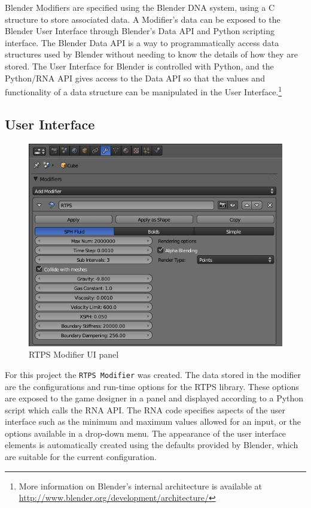 Blender Modifiers are specified using the Blender DNA system, using a C
structure to store associated data. A Modifier's data can be exposed to the Blender User Interface
through Blender's Data API and Python scripting interface. The Blender Data API
is a way to programmatically access data structures used by Blender without
needing to know the details of how they are stored.\cite{b3dDataAPI} The User
Interface for Blender is controlled with Python, and the Python/RNA API gives
access to the Data API so that the values and functionality of a data structure
can be manipulated in the User Interface.\footnote{More information on
Blender's internal architecture is available at
\url{http://www.blender.org/development/architecture/}}


\subsection{User Interface}
\begin{figure}[!htc]
 		\centering
		\includegraphics[scale=0.6]{figures/ui_mod.png}
        \caption{ RTPS Modifier UI panel }
		\label{fig:ui_mod}
\end{figure}


For this project the \verb|RTPS Modifier| was created.\cite{enjaCustomModifier} The
data stored in the modifier are the configurations and run-time options for the
RTPS library.  These options are exposed to the game designer in a panel and
displayed according to a Python script which calls the RNA API. The RNA code
specifies aspects of the user interface such as the minimum and maximum values
allowed for an input, or the options available in a drop-down menu. The
appearance of the user interface elements is automatically created using the
defaults provided by Blender, which are suitable for the current configuration.


